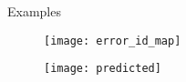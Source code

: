 \begin{block}{Examples}

    \begin{figure}
        \texttt{[image: error\_id\_map]}
    \end{figure}
    \begin{figure}
        \texttt{[image: predicted]}
    \end{figure}

\end{block}
